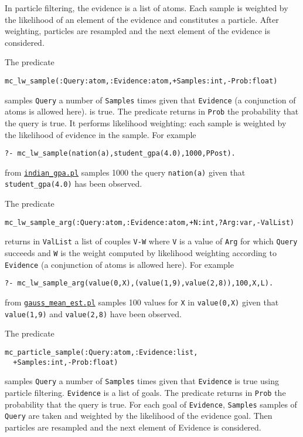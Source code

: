 In particle filtering, the evidence is a list of atoms. Each sample is weighted by the
likelihood of an element of the evidence and constitutes a particle. 
After weighting, particles are resampled and the next element of the evidence
is considered.

 The predicate 
\begin{verbatim}
mc_lw_sample(:Query:atom,:Evidence:atom,+Samples:int,-Prob:float)
\end{verbatim}
samples \verb|Query|  a number of \verb|Samples| times given that \verb|Evidence|
(a conjunction of atoms is allowed here). is true.
The predicate returns in \verb|Prob| the probability that the query is true.
It performs likelihood weighting: each sample is weighted by the
likelihood of evidence in the sample.
For example
\begin{verbatim}
?- mc_lw_sample(nation(a),student_gpa(4.0),1000,PPost).
\end{verbatim}
from \href{http://cplint.lamping.unife.it/example/inference/indian_gpa.pl}{\texttt{indian\_gpa.pl}} samples 1000 the query
\verb|nation(a)| given that \verb|student_gpa(4.0)| has been observed.


 The predicate 
\begin{verbatim}
mc_lw_sample_arg(:Query:atom,:Evidence:atom,+N:int,?Arg:var,-ValList)
\end{verbatim}
returns in \verb|ValList| a list of couples \verb|V-W| where \verb|V| is a value of \verb|Arg| 
for which \verb|Query| succeeds and \verb|W| is the
weight computed by likelihood weighting
according to \verb|Evidence| (a conjunction of atoms is allowed here).
For example
\begin{verbatim}
?- mc_lw_sample_arg(value(0,X),(value(1,9),value(2,8)),100,X,L).
\end{verbatim}
from \href{http://cplint.lamping.unife.it/example/inference/gauss_mean_est.pl}{\texttt{gauss\_mean\_est.pl}} samples 100 values for \verb|X| in
\verb|value(0,X)| given that \verb|value(1,9)| and \verb|value(2,8)| have been observed.

The predicate
\begin{verbatim}
mc_particle_sample(:Query:atom,:Evidence:list,
  +Samples:int,-Prob:float)
\end{verbatim}
samples \verb|Query|  a number of \verb|Samples| times given that 
\verb|Evidence|
is true using particle filtering. \verb|Evidence| is a list of goals.
The predicate returns in \verb|Prob| the probability that the query is true.
For each goal of \verb|Evidence|, \verb|Samples| samples of \verb|Query| are taken
and weighted by the likelihood of the evidence goal.
Then particles are resampled and the next element of Evidence
is considered.


